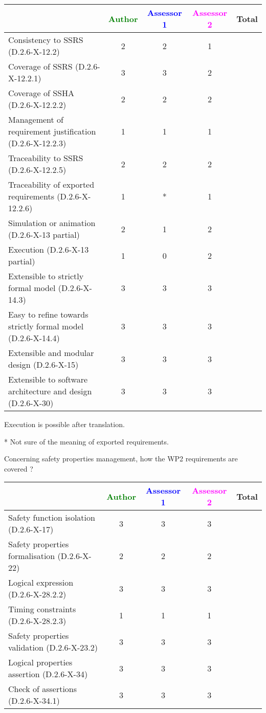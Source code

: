 \begin{tabular}{|l | c | c | c | c|}
\hline
& \textcolor{green}{Author} & \textcolor{blue}{Assessor 1} & \textcolor{magenta}{Assessor 2} & Total \\
\hline 
Consistency to SSRS (D.2.6-X-12.2) & 2 & 2 & 1 &  \\
\hline
Coverage of SSRS (D.2.6-X-12.2.1)  & 3 & 3 & 2 &  \\
\hline
Coverage of SSHA (D.2.6-X-12.2.2)  & 2 & 2 & 2 &  \\
\hline
Management of requirement justification (D.2.6-X-12.2.3)  & 1 & 1 & 1 &  \\
\hline
Traceability to  SSRS (D.2.6-X-12.2.5)  & 2 & 2 & 2 &  \\
\hline
Traceability of exported requirements (D.2.6-X-12.2.6)  & 1 & * & 1 &  \\
\hline
Simulation or animation (D.2.6-X-13 partial)  & 2 & 1 & 2 &  \\
\hline
Execution (D.2.6-X-13 partial)  & 1 & 0 & 2 &  \\
\hline
Extensible to strictly formal model (D.2.6-X-14.3) & 3 & 3 & 3 &  \\
\hline
Easy to  refine towards strictly formal model (D.2.6-X-14.4) & 3 & 3 & 3 &  \\
\hline
Extensible and modular design (D.2.6-X-15)  & 3 & 3 & 3 &  \\
\hline
Extensible to software architecture and design (D.2.6-X-30)   & 3 & 3 & 3 &  \\
\hline
\end{tabular}


\begin{author_comment}
Execution is possible after translation.
\end{author_comment}
\begin{assessor1}
* Not sure of the meaning of exported requirements.
\end{assessor1}

Concerning safety properties management, how the WP2 requirements are covered ?

\begin{tabular}{|l | c | c | c | c|}
\hline
& \textcolor{green}{Author} & \textcolor{blue}{Assessor 1} & \textcolor{magenta}{Assessor 2} & Total \\
\hline 
Safety function isolation (D.2.6-X-17)  & 3 & 3 & 3 &  \\
\hline 
Safety properties formalisation (D.2.6-X-22)  & 2 & 2 & 2 &  \\
\hline
Logical expression (D.2.6-X-28.2.2)  & 3 & 3 & 3 &  \\
\hline
Timing constraints (D.2.6-X-28.2.3)  & 1 & 1 & 1 &  \\
\hline
Safety properties validation (D.2.6-X-23.2)  & 3 & 3 & 3 &  \\
\hline
Logical properties assertion (D.2.6-X-34)  &  3 & 3 & 3 &  \\
\hline
Check  of assertions (D.2.6-X-34.1)  & 3 & 3 & 3 &  \\
\hline
\end{tabular}


